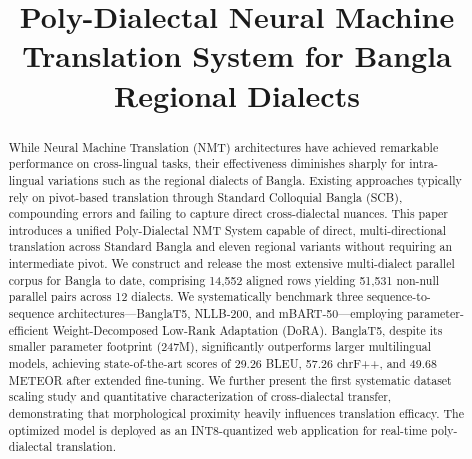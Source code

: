 \documentclass[conference]{IEEEtran}
\begin{document}
\title{Poly-Dialectal Neural Machine Translation System for Bangla Regional Dialects}

\author{
}

\maketitle

\begin{abstract}
While Neural Machine Translation (NMT) architectures have achieved remarkable performance on cross-lingual tasks, their effectiveness diminishes sharply for intra-lingual variations such as the regional dialects of Bangla. Existing approaches typically rely on pivot-based translation through Standard Colloquial Bangla (SCB), compounding errors and failing to capture direct cross-dialectal nuances. This paper introduces a unified Poly-Dialectal NMT System capable of direct, multi-directional translation across Standard Bangla and eleven regional variants without requiring an intermediate pivot. We construct and release the most extensive multi-dialect parallel corpus for Bangla to date, comprising 14,552 aligned rows yielding 51,531 non-null parallel pairs across 12 dialects. We systematically benchmark three sequence-to-sequence architectures---BanglaT5, NLLB-200, and mBART-50---employing parameter-efficient Weight-Decomposed Low-Rank Adaptation (DoRA). BanglaT5, despite its smaller parameter footprint (247M), significantly outperforms larger multilingual models, achieving state-of-the-art scores of 29.26 BLEU, 57.26 chrF++, and 49.68 METEOR after extended fine-tuning. We further present the first systematic dataset scaling study and quantitative characterization of cross-dialectal transfer, demonstrating that morphological proximity heavily influences translation efficacy. The optimized model is deployed as an INT8-quantized web application for real-time poly-dialectal translation.
\end{abstract}
\end{document}
